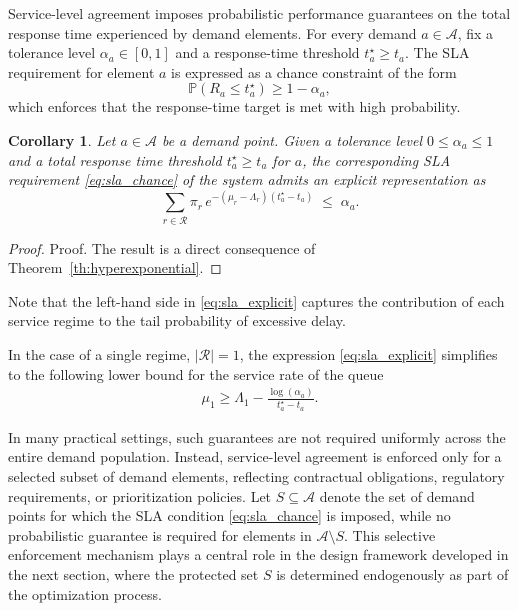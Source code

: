 \documentclass[letter,11pt, reqno]{amsart}
\newtheorem{corollary}{Corollary}
\def\P{\mathbb{P}}
\def\A{\mathcal{A}}
\def\RR{\mathcal{R}}
\begin{document}
Service-level agreement imposes probabilistic performance guarantees on the total
response time experienced by demand elements. For every demand $a\in\A$, fix a tolerance level $\alpha_a\in[0,1]$ and
a response-time threshold $t_a^\star\ge t_a$. The SLA requirement for element $a$
is expressed as a chance constraint of the form
\begin{equation}
\P(R_a \le t_a^\star) \ge 1-\alpha_a,
\label{eq:sla_chance}
\end{equation}
which enforces that the response-time target is met with high probability.

\begin{corollary}\label{coro:sla_explicit}
    Let $a\in\A$ be a demand point. Given a tolerance level  $0\le\alpha_a\le 1$ and a total response time threshold $t_a^\star\ge t_a$ for $a$, the corresponding {\rm SLA} requirement \eqref{eq:sla_chance} of the system admits an explicit representation as
    \begin{equation}
\sum_{r\in\mathcal{R}}
\pi_r\,e^{-(\mu_r-\Lambda_r)(t_a^\star-t_a)}
\;\le\;
\alpha_a.
\label{eq:sla_explicit}
\end{equation}
\end{corollary}
\begin{proof}{Proof.}
    The result is a direct consequence of Theorem~\ref{th:hyperexponential}.%
\end{proof}

Note that the left-hand side in \eqref{eq:sla_explicit} captures the contribution of each service regime to the tail probability
of excessive delay.

In the case of a single regime, $|\RR|=1$, the expression \eqref{eq:sla_explicit} simplifies to the following lower bound for the service rate of the queue
\begin{align}\label{eq:sla_1reg}
\mu_1 \geq \Lambda_1 - \frac{\log(\alpha_a)}{t_a^\star-t_a}.
\end{align}

In many practical settings, such guarantees are not required uniformly across the
entire demand population. Instead, service-level agreement is enforced only for
a selected subset of demand elements, reflecting contractual obligations,
regulatory requirements, or prioritization policies. Let
$S\subseteq\mathcal{A}$ denote the set of demand points for which the SLA condition
\eqref{eq:sla_chance} is imposed, while no probabilistic guarantee is required
for elements in $\mathcal{A}\setminus S$. This selective enforcement mechanism
plays a central role in the design framework developed in the next section, where
the protected set $S$ is determined endogenously as part of the optimization
process.
\end{document}
